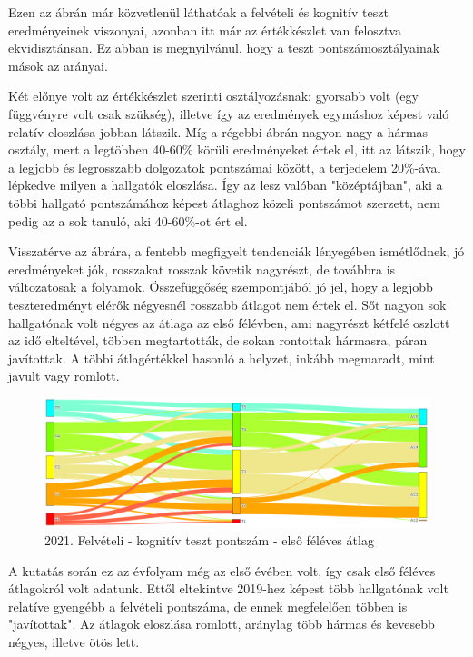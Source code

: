 \documentclass[12pt]{article}
\begin{document}
Ezen az ábrán már közvetlenül láthatóak a felvételi és kognitív teszt eredményeinek viszonyai, azonban itt már az értékkészlet van felosztva ekvidisztánsan. Ez abban is megnyilvánul, hogy a teszt pontszámosztályainak mások az arányai. 

Két előnye volt az értékkészlet szerinti osztályozásnak: gyorsabb volt (egy függvényre volt csak szükség), illetve így az eredmények egymáshoz képest való relatív eloszlása jobban látszik. Míg a régebbi ábrán nagyon nagy a hármas osztály, mert a legtöbben 40-60\% körüli eredményeket értek el, itt az látszik, hogy a legjobb és legrosszabb dolgozatok pontszámai között, a terjedelem 20\%-ával lépkedve milyen a hallgatók eloszlása. Így az lesz valóban "középtájban", aki a többi hallgató pontszámához képest átlaghoz közeli pontszámot szerzett, nem pedig az a sok tanuló, aki 40-60\%-ot ért el.

Visszatérve az ábrára, a fentebb megfigyelt tendenciák lényegében ismétlődnek, jó eredményeket jók, rosszakat rosszak követik nagyrészt, de továbbra is változatosak a folyamok. Összefüggőség szempontjából jó jel, hogy a legjobb teszteredményt elérők négyesnél rosszabb átlagot nem értek el. Sőt nagyon sok hallgatónak volt négyes az átlaga az első félévben, ami nagyrészt kétfelé oszlott az idő elteltével, többen megtartották, de sokan rontottak hármasra, páran javítottak. A többi átlagértékkel hasonló a helyzet, inkább megmaradt, mint javult vagy romlott.


\begin{figure}[H]
\centering
\includegraphics[scale=0.6]{kepek/2021_felvi_teszt_atlag.png}
\caption{2021. Felvételi - kognitív teszt pontszám - első féléves átlag}
\label{fig:2021_felvi_teszt_atlag}
\end{figure}

A kutatás során ez az évfolyam még az első évében volt, így csak első féléves átlagokról volt adatunk. Ettől eltekintve 2019-hez képest több hallgatónak volt relatíve gyengébb a felvételi pontszáma, de ennek megfelelően többen is "javítottak". Az átlagok eloszlása romlott, aránylag több hármas és kevesebb négyes, illetve ötös lett. 
\end{document}
